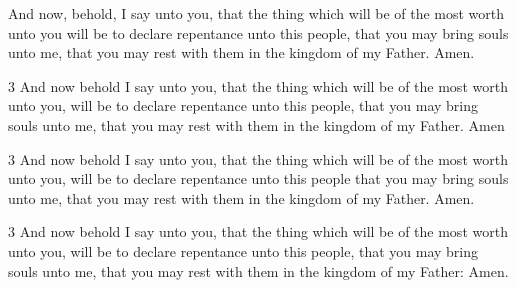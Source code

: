 		And now, behold, I say unto you, that the thing which will be of the most worth unto you will be to declare repentance unto this people, that you may bring souls unto me, that you may rest with them in the kingdom of my Father. Amen.

		\begin{framed}
		\scriptsize
			\begin{compactdesc}
				\item[JSP] 3 And now behold I say unto you, that the thing which will be of the most worth unto you, will be to declare repentance unto this people, that you may bring souls unto me, that you may rest with them in the kingdom of my Father. Amen
				\item[DC 1835] 3 And now behold I say unto you, that the thing which will be of the most worth unto you, will be to declare repentance unto this people that you may bring souls unto me, that you may rest with them in the kingdom of my Father. Amen.
				\item[DC 1844] 3 And now behold I say unto you, that the thing which will be of the most worth unto you, will be to declare repentance unto this people, that you may bring souls unto me, that you may rest with them in the kingdom of my Father: Amen.
			\end{compactdesc}
		\end{framed}	